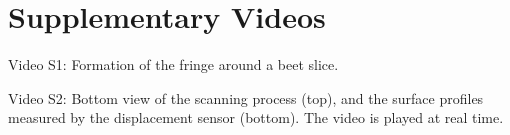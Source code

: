 \documentclass[aps,preprint]{revtex4-2}
\begin{document}

\newpage
\section{Supplementary Videos}

Video S1: Formation of the fringe around a beet slice.

Video S2: Bottom view of the scanning process (top), and the surface profiles measured by the displacement sensor (bottom). The video is played at real time. 
\end{document}
